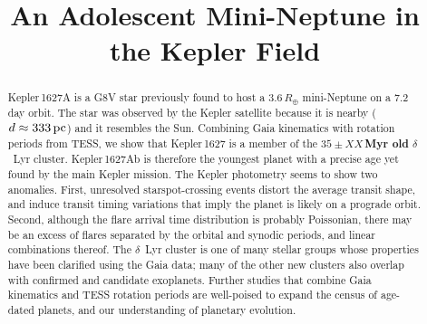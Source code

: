 \documentclass[12pt,modern,twocolumn,tighten]{aastex63}
\begin{document}
\title{
  An Adolescent Mini-Neptune in the Kepler Field
}



\begin{abstract}
  Kepler\,1627A is a G8V star previously found to host a
  $3.6\,R_\oplus$ mini-Neptune on a 7.2\,day orbit.  The star was
  observed by the Kepler satellite because it is nearby ($d\approx
  333\,{\rm pc}$) and it resembles the Sun.  Combining Gaia kinematics
  with rotation periods from TESS, we show that Kepler\,1627 is a
  member of the {\bf $35\pm XX$\,Myr old} $\delta$~Lyr cluster.
  Kepler\,1627Ab is therefore the youngest planet with a precise age
  yet found by the main Kepler mission.  The Kepler
  photometry seems to show two anomalies.  First, unresolved
  starspot-crossing events distort the average transit shape, and
  induce transit timing variations that imply the planet is likely on
  a prograde orbit.  Second, although the flare arrival time
  distribution is probably Poissonian, there may be an excess of
  flares separated by the orbital and synodic periods, and linear
  combinations thereof.  The $\delta$~Lyr cluster is one of many
  stellar groups whose properties have been clarified using the Gaia
  data; many of the other new clusters also overlap with confirmed and
  candidate exoplanets.  Further studies that combine Gaia kinematics
  and TESS rotation periods are well-poised to expand the census of
  age-dated planets, and our understanding of planetary evolution.
\end{abstract}

\end{document}

